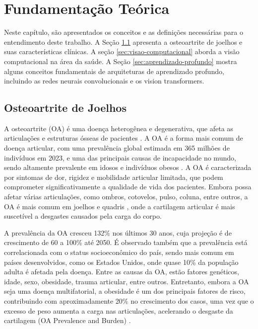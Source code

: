 \chapter{Fundamentação Teórica}\label{cap:fundamentacao}

Neste capítulo, são apresentados os conceitos e as definições necessárias para o entendimento deste trabalho. A Seção \ref{sec:osteoartrite} apresenta a osteoartrite de joelhos e suas características clínicas. A seção \ref{sec:visao-computacional} aborda a visão computacional na área da saúde. A Seção \ref{sec:aprendizado-profundo} mostra alguns conceitos fundamentais de arquiteturas de aprendizado profundo, incluindo as redes neurais convolucionais e os vision transformers.


\section{Osteoartrite de Joelhos}\label{sec:osteoartrite}

A osteoartrite (OA) é uma doença heterogênea e degenerativa, que afeta as articulações e estruturas ósseas de pacientes \cite{Kraus2015}. A OA é a forma mais comum de doença articular, com uma prevalência global estimada em 365 milhões de indivíduos em 2023, e uma das principais causas de incapacidade no mundo, sendo altamente prevalente em idosos e indivíduos obesos \cite{Luis2022}. A OA é caracterizada por sintomas de dor, rigidez e mobilidade articular limitada, que podem comprometer significativamente a qualidade de vida dos pacientes. Embora possa afetar várias articulações, como ombros, cotovelos, pulso, coluna, entre outros, a OA é mais comum em joelhos e quadris \cite{PACCA2018}, onde a cartilagem articular é mais suscetível a desgastes causados pela carga do corpo.

A prevalência da OA cresceu 132\% nos últimos 30 anos, cuja projeção é de crescimento de 60 a 100\% até 2050. É observado também que a prevalência está correlacionada com o status socioeconômico do país, sendo mais comum em países desenvolvidos, como os Estados Unidos, onde quase 10\% da população adulta é afetada pela doença. Entre as causas da OA, estão fatores genéticos, idade, sexo, obesidade, trauma articular, entre outros. Entretanto, embora a OA seja uma doença multifatorial, a obesidade é um dos principais fatores de risco, contribuindo com aproximadamente 20\% no crescimento dos casos, uma vez que o excesso de peso aumenta a carga nas articulações, acelerando o desgaste da cartilagem (OA Prevalence and Burden) \cite{Courties2024}.


